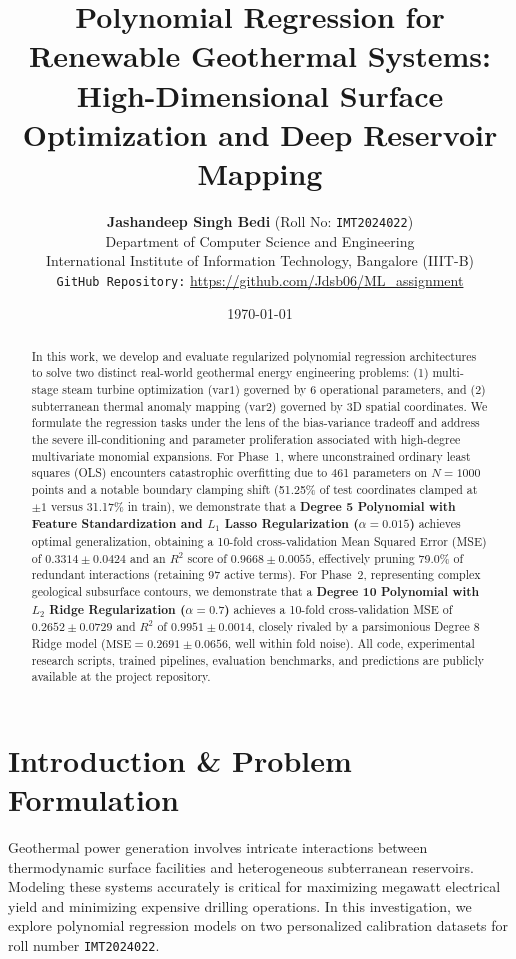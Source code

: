 \documentclass[10pt,twocolumn]{article}
\title{\textbf{\Large Polynomial Regression for Renewable Geothermal Systems: \\ High-Dimensional Surface Optimization and Deep Reservoir Mapping}}
\author{\textbf{Jashandeep Singh Bedi} \quad (Roll No: \texttt{IMT2024022}) \\
Department of Computer Science and Engineering \\
International Institute of Information Technology, Bangalore (IIIT-B) \\
\texttt{GitHub Repository:} \url{https://github.com/Jdsb06/ML_assignment}}
\date{\today}
\begin{document}
\maketitle

\begin{abstract}
\noindent In this work, we develop and evaluate regularized polynomial regression architectures to solve two distinct real-world geothermal energy engineering problems: (1) multi-stage steam turbine optimization ($\text{var1}$) governed by 6 operational parameters, and (2) subterranean thermal anomaly mapping ($\text{var2}$) governed by 3D spatial coordinates. We formulate the regression tasks under the lens of the bias-variance tradeoff and address the severe ill-conditioning and parameter proliferation associated with high-degree multivariate monomial expansions. For Phase~1, where unconstrained ordinary least squares (OLS) encounters catastrophic overfitting due to 461 parameters on $N=1000$ points and a notable boundary clamping shift (51.25\% of test coordinates clamped at $\pm 1$ versus 31.17\% in train), we demonstrate that a \textbf{Degree 5 Polynomial with Feature Standardization and $L_1$ Lasso Regularization ($\alpha = 0.015$)} achieves optimal generalization, obtaining a 10-fold cross-validation Mean Squared Error (MSE) of $\mathbf{0.3314 \pm 0.0424}$ and an $R^2$ score of $\mathbf{0.9668 \pm 0.0055}$, effectively pruning 79.0\% of redundant interactions (retaining 97 active terms). For Phase~2, representing complex geological subsurface contours, we demonstrate that a \textbf{Degree 10 Polynomial with $L_2$ Ridge Regularization ($\alpha = 0.7$)} achieves a 10-fold cross-validation MSE of $\mathbf{0.2652 \pm 0.0729}$ and $R^2$ of $\mathbf{0.9951 \pm 0.0014}$, closely rivaled by a parsimonious Degree 8 Ridge model ($\text{MSE} = 0.2691 \pm 0.0656$, well within fold noise). All code, experimental research scripts, trained pipelines, evaluation benchmarks, and predictions are publicly available at the project repository.
\end{abstract}

\section{Introduction \& Problem Formulation}
Geothermal power generation involves intricate interactions between thermodynamic surface facilities and heterogeneous subterranean reservoirs. Modeling these systems accurately is critical for maximizing megawatt electrical yield and minimizing expensive drilling operations. In this investigation, we explore polynomial regression models on two personalized calibration datasets for roll number \texttt{IMT2024022}.
\end{document}
